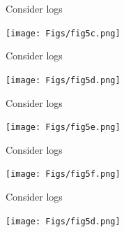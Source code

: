 \documentclass[12pt]{article}
\newcommand{\headsize}{\fontsize{35}{35} \selectfont}
\begin{document}
\newpage


\headsize \color{yellow}
\hfill \begin{minipage}{5.75in}
\centering
Consider logs
\end{minipage}

\vspace{30mm}

\centerline{\texttt{[image: Figs/fig5c.png]}}


\newpage

\addtocounter{page}{-1}

\headsize \color{yellow}
\hfill \begin{minipage}{5.75in}
\centering
Consider logs
\end{minipage}

\vspace{30mm}

\centerline{\texttt{[image: Figs/fig5d.png]}}

\newpage

\addtocounter{page}{-1}

\headsize \color{yellow}
\hfill \begin{minipage}{5.75in}
\centering
Consider logs
\end{minipage}

\vspace{30mm}

\centerline{\texttt{[image: Figs/fig5e.png]}}

\newpage

\addtocounter{page}{-1}

\headsize \color{yellow}
\hfill \begin{minipage}{5.75in}
\centering
Consider logs
\end{minipage}

\vspace{30mm}

\centerline{\texttt{[image: Figs/fig5f.png]}}

\newpage

\addtocounter{page}{-1}

\headsize \color{yellow}
\hfill \begin{minipage}{5.75in}
\centering
Consider logs
\end{minipage}

\vspace{30mm}

\centerline{\texttt{[image: Figs/fig5d.png]}}

\newpage

\addtocounter{page}{-1}
\end{document}
